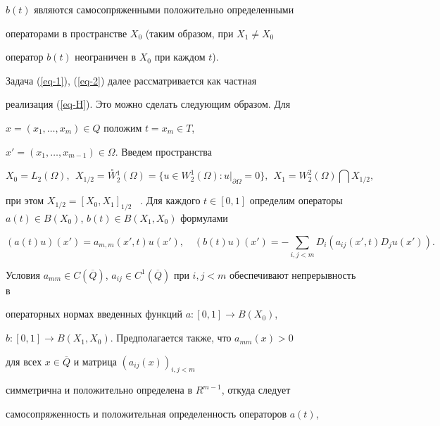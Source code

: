 $b(t)$ являются самосопряженными положительно определенными


операторами в пространстве $X_0$ (таким образом, при $X_1 \ne X_0$


оператор $b(t)$ неограничен в $X_0$ при каждом $t$).





Задача (\ref{eq-1}), (\ref{eq-2}) далее рассматривается как частная


реализация (\ref{eq-H}). Это можно сделать следующим образом. Для


$x=(x_1,\dotsc,x_m) \in Q$ положим $t=x_m \in T$,


$x'=(x_1,\dotsc,x_{m-1}) \in \Omega$. Введем пространства


\begin{equation}\label{Spaces}


X_0=L_2(\Omega), \ \ X_{1/2}=\overset{\circ}{W}{}^1_2(\Omega)=\{u \in


W^1_2(\Omega): u|_{\partial \Omega}=0\}, \ \ X_1=W^2_2(\Omega)


\bigcap X_{1/2},


\end{equation}


при этом $X_{1/2}=[X_0,X_1]_{1/2}$ \ \cite{Tribel}. Для каждого $t


\in [0,1]$ определим операторы $a(t) \in B(X_0)$, $b(t) \in


B(X_1,X_0)$ формулами


\begin{equation}\label{Defa&b}


(a(t) u)(x') = a_{m,m}(x',t)u(x'), \quad


(b(t) u)(x')=-\sum\limits_{i,j < m}D_i(a_{ij}(x',t) D_j u(x')).


\end{equation}


Условия $a_{m m} \in C(\overline{Q})$, $a_{i j} \in


C^1(\overline{Q})$ при $i,j < m$ обеспечивают непрерывность в


операторных нормах введенных функций $a:[0,1] \to B(X_0)$,


$b:[0,1] \to B(X_1,X_0)$. Предполагается также, что $a_{mm}(x)>0$ 


для всех $x \in \overline{Q}$ и матрица $(a_{ij}(x))_{i,j<m}$


симметрична и положительно определена в $R^{m-1}$, откуда следует


самосопряженность и положительная определенность операторов $a(t)$,


